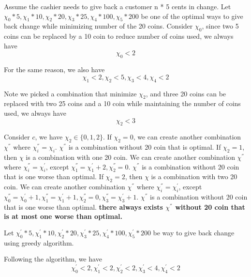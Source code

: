 \documentclass[12pt]{article}
\begin{document}
\begin{enumerate}
\begin{itemize}
Assume the cashier needs to give back a customer n * 5 cents in change.
Let
$\chi_{0} * 5, \chi_{1} * 10, \chi_{2} * 20, \chi_{3} * 25, \chi_{4} * 100, \chi_{5} * 200$
be one of the optimal ways to give back change while minimizing number of the 20 coins.
Consider $\chi_{0}$, since two 5 coins can be replaced by a 10 coin to reduce number of coins used, we always have
\begin{equation}
\chi_{0} < 2
\end{equation}

For the same reason, we also have
\begin{equation}
\chi_{1} < 2, \chi_{2} < 5, \chi_{3} < 4, \chi_{4} < 2
\end{equation}

Note we picked a combination that minimize $\chi_{2}$, and three 20 coins can be replaced with two 25 coins and a 10 coin while maintaining the number of coins used, we always have
\begin{equation}
\chi_{2} < 3
\end{equation}

Consider $c$, we have $\chi_{2} \in \{0, 1, 2\}$. If $\chi_{2} = 0$, we can create another combination $\chi^{''}$ where $\chi_{i}^{''} = \chi_{i}$. $\chi^{''}$ is a combination without 20 coin that is optimal. If $\chi_{2} = 1$, then $\chi$ is a combination with one 20 coin. We can create another combination $\chi^{''}$ where $\chi_{i}^{''} = \chi_{i}^{'}$, except $\chi_{1}^{''} = \chi_{1}^{'} + 2, \chi_{2}^{''} = 0$. $\chi^{''}$ is a combination without 20 coin that is one worse than optimal. If $\chi_{2} = 2$, then $\chi$ is a combination with two 20 coin. We can create another combination $\chi^{''}$ where $\chi_{i}^{''} = \chi_{i}^{'}$, except $\chi_{0}^{''} = \chi_{0}^{'} + 1, \chi_{1}^{''} = \chi_{1}^{'} + 1, \chi_{2}^{''} = 0, \chi_{3}^{''} = \chi_{3}^{'} + 1$. $\chi^{''}$ is a combination without 20 coin that is one worse than optimal. \textbf{there always exists $\chi^{''}$ without 20 coin that is at most one worse than optimal.}

Let
$\chi_{0}^{'} * 5, \chi_{1}^{'} * 10, \chi_{2}^{'} * 20, \chi_{3}^{'} * 25, \chi_{4}^{'} * 100, \chi_{5}^{'} * 200$
be way to give back change using greedy algorithm.

Following the algorithm, we have
\begin{equation}
\chi_{0}^{'} < 2, \chi_{1}^{'} < 2, \chi_{2}^{'} < 2, \chi_{3}^{'} < 4, \chi_{4}^{'} < 2
\end{equation}


\end{itemize}
\end{enumerate}
\end{document}
